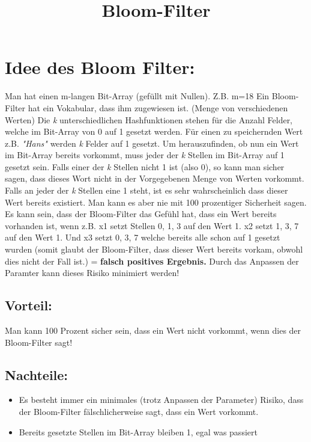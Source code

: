 \documentclass[10 pt]{scrartcl}
\title{Bloom-Filter}
\begin{document}
\maketitle
\section{Idee des Bloom Filter: }
Man hat einen m-langen Bit-Array (gefüllt mit Nullen). Z.B. m=18
Ein Bloom-Filter hat ein Vokabular, dass ihm zugewiesen ist. (Menge von verschiedenen Werten)
Die \emph{k} unterschiedlichen Hashfunktionen stehen für die Anzahl Felder, welche im Bit-Array von 0 auf 1 gesetzt werden.
Für einen zu speichernden Wert z.B. \emph{"Hans"} werden \emph{k} Felder auf 1 gesetzt.
Um herauszufinden, ob nun ein Wert im Bit-Array bereits vorkommt, muss jeder der \emph{k} Stellen im Bit-Array auf 1 gesetzt sein. Falls einer der \emph{k} Stellen nicht 1 ist (also 0), so kann man sicher sagen, dass dieses Wort nicht in der Vorgegebenen Menge von Werten vorkommt.
Falls an jeder der \emph{k} Stellen eine 1 steht, ist es sehr wahrscheinlich dass dieser Wert bereits existiert. Man kann es aber nie mit 100 prozentiger Sicherheit sagen.
Es kann sein, dass der Bloom-Filter das Gefühl hat, dass ein Wert bereits vorhanden ist, wenn z.B. x1 setzt Stellen 0, 1, 3 auf den Wert 1. x2 setzt 1, 3, 7 auf den Wert 1. Und x3 setzt 0, 3, 7 welche bereits alle schon auf 1 gesetzt wurden (somit glaubt der Bloom-Filter, dass dieser Wert bereits vorkam, obwohl dies nicht der Fall ist.) = \textbf{falsch positives Ergebnis.}
\linebreak Durch das Anpassen der Paramter kann dieses Risiko minimiert werden!
\subsection{Vorteil:}
Man kann 100 Prozent sicher sein, dass ein Wert nicht vorkommt, wenn dies der Bloom-Filter sagt!
\subsection{Nachteile:}
\begin{itemize}
    \item{Es besteht immer ein minimales (trotz Anpassen der Parameter) Risiko, dass der Bloom-Filter fälschlicherweise sagt, dass ein Wert vorkommt.}
    \item{Bereits gesetzte Stellen im Bit-Array bleiben 1, egal was passiert}
\end{itemize}
\end{document}
